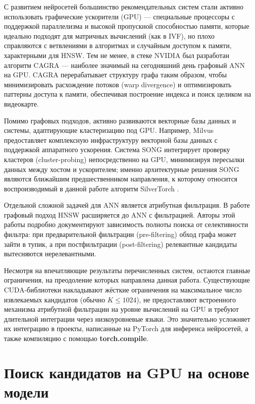 \documentclass[14pt,a4paper]{extreport}
\numberwithin{figure}{chapter}
\numberwithin{table}{chapter}
\numberwithin{equation}{chapter}
\begin{document}
С развитием нейросетей большинство рекомендательных систем стали активно использовать графические ускорители (GPU) --- специальные процессоры с поддержкой параллелизма и высокой пропускной способностью памяти, которые идеально подходят для матричных вычислений (как 
в IVF), но плохо справляются с ветвлениями в алгоритмах и случайным доступом к памяти, характерными для HNSW.
Тем не менее, в стеке NVIDIA был разработан алгоритм CAGRA \cite{ootomo2024cagra} --- наиболее значимый на 
сегодняшний день графовый ANN на GPU. CAGRA перерабатывает структуру графа таким образом, чтобы минимизировать 
расхождение потоков (warp divergence) и оптимизировать паттерны доступа к памяти, обеспечивая построение индекса и поиск 
целиком на видеокарте.

Помимо графовых подходов, активно развиваются векторные базы данных и системы, адаптирующие кластеризацию под GPU. 
Например, Milvus \cite{wang2021milvus} предоставляет комплексную инфраструктуру векторной базы данных с поддержкой 
аппаратного ускорения. Система SONG \cite{zhao2020song} интегрирует проверку кластеров (cluster-probing) непосредственно 
на GPU, минимизируя пересылки данных между хостом и ускорителем; именно архитектурные решения SONG являются ближайшим 
предшественником направления, к которому относится воспроизводимый в данной работе алгоритм SilverTorch \cite{xue2025silvertorch}.

Отдельной сложной задачей для ANN является атрибутная фильтрация. В работе \cite{zhao2022constrained} графовый подход 
HNSW расширяется до ANN с фильтрацией. Авторы этой работы подробно документируют зависимость полноты поиска от 
селективности фильтра: при предварительной фильтрации (pre-filtering) обход графа может зайти в тупик, а при 
постфильтрации (post-filtering) релевантные кандидаты вытесняются нерелевантными.

Несмотря на впечатляющие результаты перечисленных систем, остаются главные ограничения, на преодоление которых направлена 
данная работа. Существующие CUDA-библиотеки накладывают жёсткие ограничения на максимальное число извлекаемых кандидатов 
(обычно $K \le 1024$), не предоставляют встроенного механизма атрибутной фильтрации на уровне вычислений на GPU и требуют длительной интеграции через низкоуровневые языки. Это значительно усложняет их интеграцию в проекты, написанные на PyTorch для инференса нейросетей, а также компиляцию с помощью \textbf{torch.compile}.

\section{Поиск кандидатов на GPU на основе модели}
\end{document}
